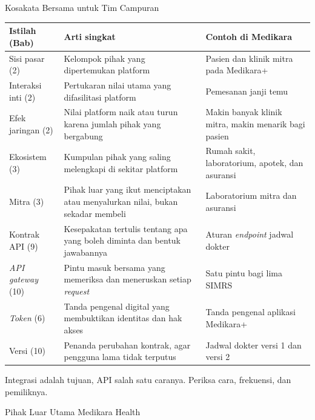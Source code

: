 \documentclass[aspectratio=169, table, 12pt]{beamer}
\begin{document}
\begin{frame}{{\Large Kosakata Bersama untuk Tim Campuran}}
  \scriptsize
  \begin{tabularx}{\textwidth}{>{\raggedright\arraybackslash}p{2.5cm}
      >{\raggedright\arraybackslash}X
      >{\raggedright\arraybackslash}p{4.7cm}}
    \hline
    \textbf{Istilah (Bab)} & \textbf{Arti singkat} & \textbf{Contoh di Medikara} \\ \hline
    Sisi pasar (2) & Kelompok pihak yang dipertemukan platform & Pasien dan klinik mitra pada Medikara+ \\ \hline
    Interaksi inti (2) & Pertukaran nilai utama yang difasilitasi platform & Pemesanan janji temu \\ \hline
    Efek jaringan (2) & Nilai platform naik atau turun karena jumlah pihak yang bergabung & Makin banyak klinik mitra, makin menarik bagi pasien \\ \hline
    Ekosistem (3) & Kumpulan pihak yang saling melengkapi di sekitar platform & Rumah sakit, laboratorium, apotek, dan asuransi \\ \hline
    Mitra (3) & Pihak luar yang ikut menciptakan atau menyalurkan nilai, bukan sekadar membeli & Laboratorium mitra dan asuransi \\ \hline
    Kontrak API (9) & Kesepakatan tertulis tentang apa yang boleh diminta dan bentuk jawabannya & Aturan \textit{endpoint} jadwal dokter \\ \hline
    \textit{API gateway} (10) & Pintu masuk bersama yang memeriksa dan meneruskan setiap \textit{request} & Satu pintu bagi lima SIMRS \\ \hline
    \textit{Token} (6) & Tanda pengenal digital yang membuktikan identitas dan hak akses & Tanda pengenal aplikasi Medikara+ \\ \hline
    Versi (10) & Penanda perubahan kontrak, agar pengguna lama tidak terputus & Jadwal dokter versi 1 dan versi 2 \\ \hline
  \end{tabularx}

  \vspace{3pt}
  Integrasi adalah tujuan, API salah satu caranya. Periksa cara, frekuensi, dan pemiliknya.
\end{frame}

\begin{frame}{{\Large Pihak Luar Utama Medikara Health}}
  \centering
  \resizebox{!}{0.74\textheight}{}
\end{frame}
\end{document}
